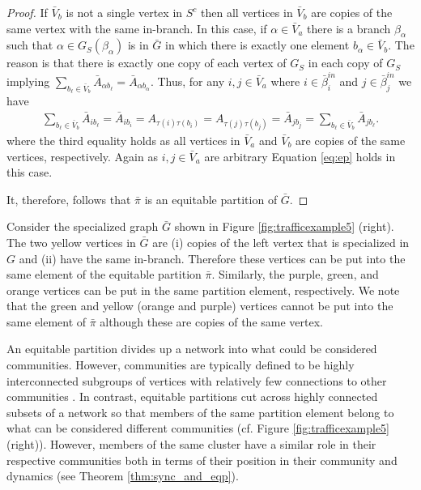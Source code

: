 \documentclass[12pt]{thesis}
\begin{document}
\begin{proof}
If $\bar{V}_b$ is not a single vertex in $S^c$ then all vertices in $\bar{V}_b$ are copies of the same vertex with the same in-branch.
In this case, if $\alpha\in\bar{V}_a$ there is a branch $\beta_\alpha$ such that $\alpha\in G_S(\beta_\alpha)$ is in $\bar{G}$ in which there is exactly one element $b_\alpha\in\bar{V}_b$.
The reason is that there is exactly one copy of each vertex of $G_S$ in each copy of $G_S$ implying $\sum_{b_\ell\in\bar{V}_b} \bar{A}_{\alpha b_\ell}=\bar{A}_{\alpha b_\alpha}$.
Thus, for any $i,j\in\bar{V}_a$ where $i\in\bar{\beta}_i^{in}$ and $j\in\bar{\beta}_j^{in}$ we have
\begin{align*}
    \sum_{b_\ell\in\bar{V}_b}\bar{A}_{ib_\ell} = \bar{A}_{i b_i} = A_{\tau(i)\tau(b_i)} = A_{\tau(j)\tau(b_j)} = \bar{A}_{jb_j} = \sum_{b_\ell\in\bar{V}_b}\bar{A}_{jb_\ell}.
\end{align*}
where the third equality holds as all vertices in $\bar{V}_a$ and $\bar{V}_b$ are copies of the same vertices, respectively.
Again as $i,j\in\bar{V}_a$ are arbitrary Equation \eqref{eq:ep} holds in this case. 

It, therefore, follows that $\bar{\pi}$ is an equitable partition of $\bar{G}$.
\end{proof}

\begin{example}
Consider the specialized graph $\bar{G}$ shown in Figure \ref{fig:trafficexample5} (right).
The two yellow vertices in $\bar{G}$ are (i) copies of the left vertex that is specialized in $G$ and (ii) have the same in-branch.
Therefore these vertices can be put into the same element of the equitable partition $\bar{\pi}$.
Similarly, the purple, green, and orange vertices can be put in the same partition element, respectively.
We note that the green and yellow (orange and purple) vertices cannot be put into the same element of $\bar{\pi}$ although these are copies of the same vertex.
\end{example}

An equitable partition divides up a network into what could be considered communities.
However, {communities} are typically defined to be highly interconnected subgroups of vertices with relatively few connections to other communities \cite{Newman10}.
In contrast, equitable partitions cut across highly connected subsets of a network so that members of the same partition element belong to what can be considered different communities (cf. Figure \ref{fig:trafficexample5} (right)).
However, members of the same cluster have a similar {role} in their respective communities both in terms of their position in their community and dynamics (see Theorem \ref{thm:sync_and_eqp}).
\end{document}
